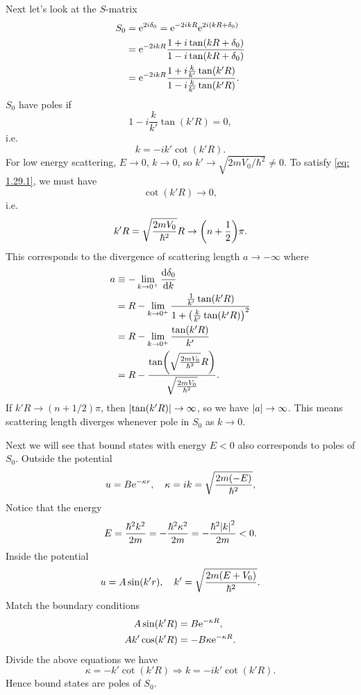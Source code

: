 \documentclass[10pt]{article}
\begin{document}
	Next let's look at the $S$-matrix
	\begin{align*}
		S_0 &= {\mathrm{e}}^{2i\delta_0} = {\mathrm{e}}^{-2ikR} {\mathrm{e}}^{2i(kR + \delta_0)} \\
		&= {\mathrm{e}}^{-2ikR} \frac{1+ i \tan(kR + \delta_0)}{1 - i \tan(k R + \delta_0)} \\
		&= {\mathrm{e}}^{-2ikR} \frac{1 + i \frac{k}{k'} \tan(k' R)}{1 - i \frac{k}{k'} \tan(k' R)}.
	\end{align*}
	$S_0$ have poles if
	\begin{equation}
		1 - i \frac{k}{k'} \tan(k' R) = 0, \label{eq: 1.29.1}
	\end{equation}
	i.e.
	\begin{equation}
		k = -i k' \cot(k' R).
	\end{equation}
	For low energy scattering, $E \to 0$, $k\to 0$, so $k' \to \sqrt{2mV_0/\hbar^2} \neq 0$. To satisfy \eqref{eq: 1.29.1}, we must have
	\begin{equation}
		\cot(k' R) \to 0,
	\end{equation}
	i.e.
	\begin{equation}
		k' R = \sqrt{\frac{2mV_0}{\hbar^2}} R \to \qty(n + \frac{1}{2}) \pi.
	\end{equation}
	This corresponds to the divergence of scattering length $a \to - \infty$ where
	\begin{align*}
		a &\equiv -\lim_{k \to 0^+} \dv{\delta_0}{k} \\
		&= R - \lim_{k \to 0^+} \frac{\frac{1}{k'}\tan(k'R)}{1 + \qty(\frac{k}{k'}\tan(k'R))^2} \\
		&= R - \lim_{k \to 0^+} \frac{\tan(k'R)}{k'} \\
		&= R - \frac{\tan(\sqrt{\frac{2mV_0}{\hbar^2}} R)}{\sqrt{\frac{2mV_0}{\hbar^2}}}.
	\end{align*}
	If $k' R \to (n + 1/2) \pi$, then $\abs{\tan(k'R)} \to \infty$, so we have $\abs{a} \to \infty$. This means scattering length diverges whenever pole in $S_0$ as $k \to 0$.

	Next we will see that bound states with energy $E < 0$ also corresponds to poles of $S_0$. Outside the potential
	\begin{equation}
		u = B \e^{- \kappa r}\qc \kappa = ik = \sqrt{\frac{2m(-E)}{\hbar^2}},
	\end{equation}
	Notice that the energy
	\begin{equation}
		E = \frac{\hbar^2 k^2}{2m} = - \frac{\hbar^2 \kappa^2}{2m} = - \frac{\hbar^2 \abs{k}^2}{2m} < 0.
	\end{equation}
	Inside the potential
	\begin{equation}
		u = A \sin(k' r)\qc k' = \sqrt{\frac{2m(E + V_0)}{\hbar^2}}.
	\end{equation}
	Match the boundary conditions
	\begin{align*}
		A \sin(k' R) &= B {\mathrm{e}}^{- \kappa R}, \\
		A k' \cos(k' R) &= - B \kappa {\mathrm{e}}^{- \kappa R}.
	\end{align*}
	Divide the above equations we have
	\begin{equation}
		\kappa = -k' \cot(k' R) \Longrightarrow k = -i k' \cot(k' R).
	\end{equation}
	Hence bound states are poles of $S_0$.
\end{document}
